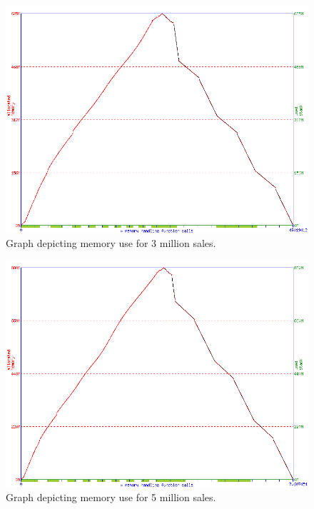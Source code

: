 \documentclass[a4paper]{report}
\begin{document}
\begin{figure}[H]
    \begin{center}
        \includegraphics[width=1\textwidth]{memusage_3M.png}\par\vspace{1cm}
        \caption{Graph depicting memory use for 3 million sales.}
        \label{img:memusage_3M}
    \end{center}
\end{figure}

\begin{figure}[H]
    \begin{center}
        \includegraphics[width=1\textwidth]{memusage_5M.png}\par\vspace{1cm}
        \caption{Graph depicting memory use for 5 million sales.}
        \label{img:memusage_5M}
    \end{center}
\end{figure}
\end{document}
